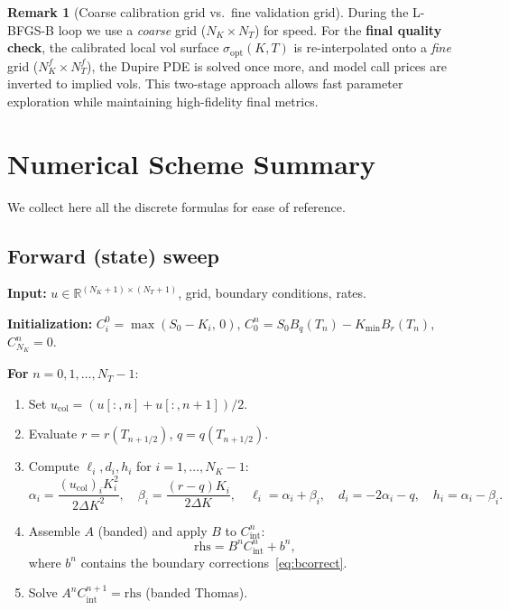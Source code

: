 \documentclass[11pt, a4paper]{article}
\newcommand{\R}{\mathbb{R}}
\newcommand{\dK}{\Delta K}
\theoremstyle{definition}
\newtheorem{remark}{Remark}[section]
\theoremstyle{plain}
\begin{document}
\begin{remark}[Coarse calibration grid vs.\ fine validation grid]
During the L-BFGS-B loop we use a \emph{coarse} grid ($N_K \times N_T$)
for speed.  For the \textbf{final quality check}, the calibrated local vol
surface $\sigma_\text{opt}(K,T)$ is re-interpolated onto a \emph{fine} grid
($N_K^f \times N_T^f$), the Dupire PDE is solved once more, and model call
prices are inverted to implied vols.  This two-stage approach allows fast
parameter exploration while maintaining high-fidelity final metrics.
\end{remark}

\section{Numerical Scheme Summary}

We collect here all the discrete formulas for ease of reference.

\subsection{Forward (state) sweep}

\textbf{Input:} $u \in \R^{(N_K+1)\times(N_T+1)}$,
grid, boundary conditions, rates.

\textbf{Initialization:}
$C_i^0 = \max(S_0 - K_i,\, 0)$,\quad
$C_0^n = S_0 B_q(T_n) - K_{\min} B_r(T_n)$,\quad
$C_{N_K}^n = 0$.

\textbf{For} $n = 0, 1, \ldots, N_T - 1$:
\begin{enumerate}
  \item Set $u_{\text{col}} = (u[:,n] + u[:,n+1]) / 2$.
  \item Evaluate $r = r(T_{n+1/2})$, $q = q(T_{n+1/2})$.
  \item Compute $\ell_i, d_i, h_i$ for $i = 1, \ldots, N_K-1$:
    \[
      \alpha_i = \frac{(u_\text{col})_i K_i^2}{2\dK^2},\quad
      \beta_i  = \frac{(r-q)K_i}{2\dK},\quad
      \ell_i = \alpha_i+\beta_i,\quad
      d_i = -2\alpha_i - q,\quad
      h_i = \alpha_i - \beta_i.
    \]
  \item Assemble $A$ (banded) and apply $B$ to $C_\text{int}^n$:
    \[
      \text{rhs} = B^n C_\text{int}^n + b^n,
    \]
    where $b^n$ contains the boundary corrections~\eqref{eq:bcorrect}.
  \item Solve $A^n C_\text{int}^{n+1} = \text{rhs}$ (banded Thomas).
\end{enumerate}
\end{document}
